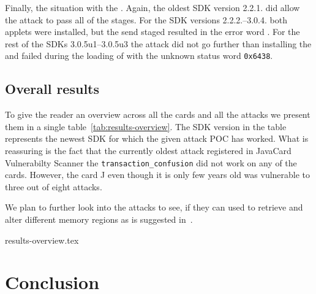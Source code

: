 \documentclass{../llncs/llncs}
\begin{document}
    Finally, the situation with the \Jcard. Again, the oldest SDK version 2.2.1. did allow the attack to pass all of the stages. For the SDK versions 2.2.2.--3.0.4. both applets were installed, but the send staged resulted in the error word \shortswinsnotsupported. For the rest of the SDKs 3.0.5u1--3.0.5u3 the attack did not go further than installing the \vulnscap and failed during the loading of \appletscap with the unknown status word \texttt{0x6438}.


            \subsection{Overall results}

        To give the reader an overview across all the cards and all the attacks we present them in a single table~\ref{tab:results-overview}. The SDK version in the table represents the newest SDK for which the given attack POC has worked. What is reassuring is the fact that the currently oldest attack registered in JavaCard Vulnerabilty Scanner the \texttt{transaction_confusion} did not work on any of the cards. However, the card J even though it is only few years old was vulnerable to three out of eight attacks.
    
        We plan to further look into the attacks to see, if they can used to retrieve and alter different memory regions as is suggested in~\cite{se:oracle:part1}.

\setlength{\tabcolsep}{2pt}
\renewcommand{\arraystretch}{1.2}

    {results-overview.tex}

\setlength{\tabcolsep}{\oldtabcolsep}
\renewcommand{\arraystretch}{1.2}
\setlength{\floatsep}{\oldtabcolsep}


\section{Conclusion\label{sec:conclusion}}


\end{document}
